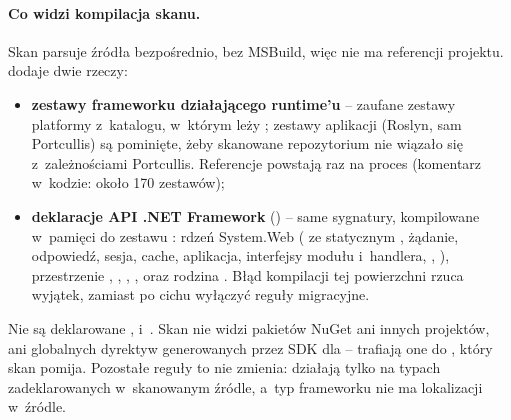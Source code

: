 \paragraph{Co widzi kompilacja skanu.} Skan parsuje źródła bezpośrednio, bez MSBuild,
więc nie ma referencji projektu.  dodaje dwie rzeczy:

\begin{itemize}[leftmargin=*]
  \item \textbf{zestawy frameworku działającego runtime'u} -- zaufane zestawy platformy
        z~katalogu, w~którym leży ; zestawy aplikacji
        (Roslyn, sam Portcullis) są pominięte, żeby skanowane repozytorium nie wiązało się
        z~zależnościami Portcullis. Referencje powstają raz na proces (komentarz w~kodzie:
        około 170 zestawów);
  \item \textbf{deklaracje API .NET Framework} () -- same
        sygnatury, kompilowane w~pamięci do zestawu :
        rdzeń System.Web ( ze statycznym , żądanie,
        odpowiedź, sesja, cache, aplikacja, interfejsy modułu i~handlera,
        , ), przestrzenie
        , , ,
        ,  oraz rodzina
        . Błąd kompilacji tej
        powierzchni rzuca wyjątek, zamiast po cichu wyłączyć reguły migracyjne.
\end{itemize}

Nie są deklarowane , 
i~. Skan nie widzi pakietów NuGet ani innych projektów, ani
globalnych dyrektyw  generowanych przez SDK dla
 -- trafiają one do , który
skan pomija. Pozostałe reguły to nie zmienia: działają tylko na typach zadeklarowanych
w~skanowanym źródle, a~typ frameworku nie ma lokalizacji w~źródle.


